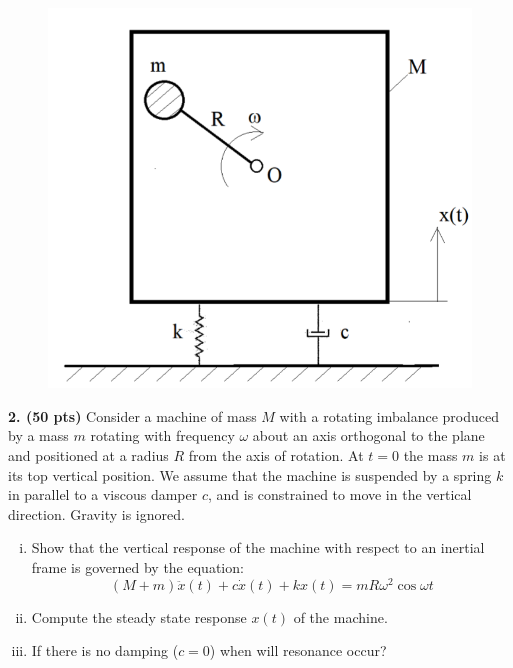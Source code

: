 \begin{problem}
    \begin{figure}
        \vspace{0.75cm}
        \centering
        \includegraphics[width=0.9\linewidth]{homework/hw1/assets/hw1_p2.png}
    \end{figure}
    \textbf{2. (50 pts)} Consider a machine of mass $M$ with a rotating imbalance produced by a mass $m$ rotating with frequency $\omega$ about an axis orthogonal to the plane and positioned at a radius $R$ from the axis of rotation. 
    At $t = 0$ the mass $m$ is at its top vertical position. 
    We assume that the machine is suspended by a spring $k$ in parallel to a viscous damper $c$, and is constrained to move in the vertical direction. 
    Gravity is ignored.

    \begin{enumerate}[(i)]
        \item {
            Show that the vertical response of the machine with respect to an inertial frame is governed by the equation:
            \begin{equation}
                (M + m) \ddot{x}(t) + c \dot{x}(t) + k x(t) = m R \omega^2 \cos \omega t
            \end{equation}
        }
        \item {
            Compute the steady state response $x(t)$ of the machine.
        }
        \item {
            If there is no damping ($c = 0$) when will resonance occur?
        }
    \end{enumerate}
\end{problem}

